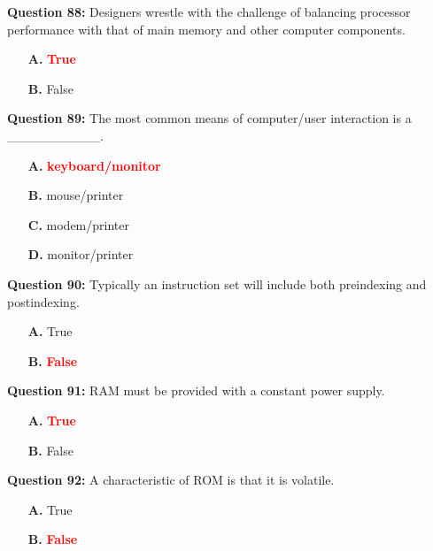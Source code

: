 \documentclass[12pt,a4paper]{article}
\begin{document}
\vspace{0.5cm}

\textbf{Question 88:} Designers wrestle with the challenge of balancing processor performance with that of main memory and other computer components.

\begin{itemize}
    \item[\textbf{A.}] \textcolor{red}{\textbf{True}}
    \item[\textbf{B.}] False
\end{itemize}

\vspace{0.5cm}

\textbf{Question 89:} The most common means of computer/user interaction is a __________.

\begin{itemize}
    \item[\textbf{A.}] \textcolor{red}{\textbf{keyboard/monitor}}
    \item[\textbf{B.}] mouse/printer
    \item[\textbf{C.}] modem/printer
    \item[\textbf{D.}] monitor/printer
\end{itemize}

\vspace{0.5cm}

\textbf{Question 90:} Typically an instruction set will include both preindexing and postindexing.

\begin{itemize}
    \item[\textbf{A.}] True
    \item[\textbf{B.}] \textcolor{red}{\textbf{False}}
\end{itemize}

\vspace{0.5cm}

\textbf{Question 91:} RAM must be provided with a constant power supply.

\begin{itemize}
    \item[\textbf{A.}] \textcolor{red}{\textbf{True}}
    \item[\textbf{B.}] False
\end{itemize}

\vspace{0.5cm}

\textbf{Question 92:} A characteristic of ROM is that it is volatile.

\begin{itemize}
    \item[\textbf{A.}] True
    \item[\textbf{B.}] \textcolor{red}{\textbf{False}}
\end{itemize}
\end{document}
